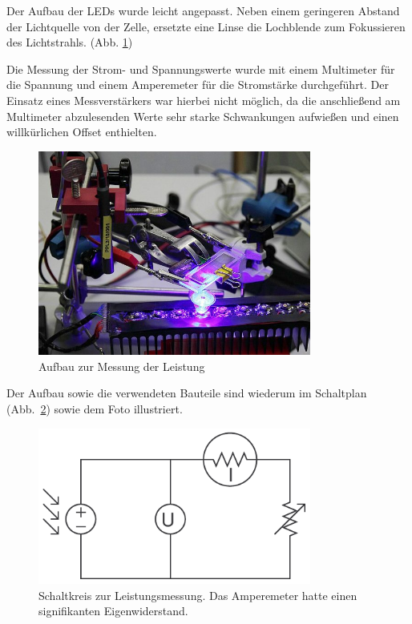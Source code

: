 \documentclass[11pt]{scrartcl}
\begin{document}
Der Aufbau der LEDs wurde leicht angepasst. Neben einem geringeren Abstand der Lichtquelle von der Zelle, ersetzte eine Linse die Lochblende zum Fokussieren des Lichtstrahls. (Abb. \ref{messung_leistung})

Die Messung der Strom- und Spannungswerte wurde mit einem Multimeter f\"ur die Spannung und einem Amperemeter f\"ur die Stromst\"arke durchgef\"uhrt. Der Einsatz eines Messverst\"arkers war hierbei nicht m\"oglich, da die anschlie\ss{}end am Multimeter abzulesenden Werte sehr starke Schwankungen aufwie\ss{}en und einen willkürlichen Offset enthielten.

\begin{figure}[ht]
\begin{center}
\includegraphics[width=0.8\textwidth]{images/messung_leistung.jpg}
\end{center}
\vspace{-1.5\baselineskip}
\caption{Aufbau zur Messung der Leistung}
\label{messung_leistung}
\end{figure}

Der Aufbau sowie die verwendeten Bauteile sind wiederum im Schaltplan (Abb.~\ref{leistungsschaltkreis}) sowie dem Foto illustriert.

\begin{figure}[ht]
\begin{center}
\includegraphics[width=0.8\textwidth]{images/leistungsmesskreis.pdf}
\end{center}
\vspace{-1.5\baselineskip}
\caption{Schaltkreis zur Leistungsmessung. Das Amperemeter hatte einen signifikanten Eigenwiderstand.}
\label{leistungsschaltkreis}
\end{figure}
\end{document}
